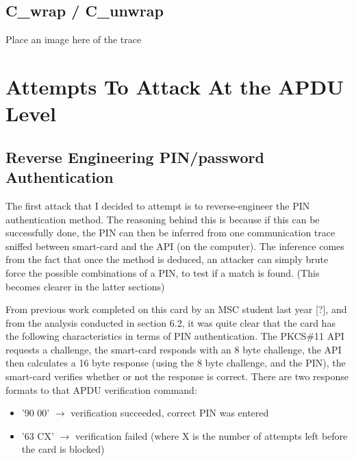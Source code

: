 \documentclass[bsc,frontabs,twoside,singlespacing,parskip,deptreport]{infthesis}     %
\begin{document}
\section{C\_wrap / C\_unwrap}
Place an image here of the trace




\chapter{Attempts To Attack At the APDU Level}


\section{Reverse Engineering PIN/password Authentication}

The first attack that I decided to attempt is to reverse-engineer the PIN authentication method. The reasoning behind this is because if this can be successfully done, the PIN can then be inferred from one communication trace sniffed between smart-card and the API (on the computer). The inference comes from the fact that once the method is deduced, an attacker can simply brute force the possible combinations of a PIN, to test if a match is found. (This becomes clearer in the latter sections)

From previous work completed on this card by an MSC student last year [?], and from the analysis conducted in section 6.2, it was quite clear that the card has the following characteristics in terms of PIN authentication. The PKCS\#11 API requests a challenge, the smart-card responds with an 8 byte challenge, the API then calculates a 16 byte response (using the 8 byte challenge, and the PIN), the smart-card verifies whether or not the response is correct. There are two response formats to that  APDU verification command:
\begin{itemize}
\item '90 00' $\rightarrow$ verification succeeded, correct PIN was entered
\item '63 CX' $\rightarrow$ verification failed (where X is the number of attempts left before the card is blocked)\\
\end{itemize}
\end{document}
